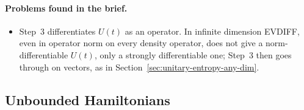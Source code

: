 \documentclass[11pt]{article}
\begin{document}
\paragraph{Problems found in the brief.}
\begin{itemize}
\item Step~3 differentiates $U(t)$ as an operator. In infinite dimension EVDIFF, even in
  operator norm on every density operator, does not give a norm-differentiable $U(t)$, only a
  strongly differentiable one; Step~3 then goes through on vectors, as in
  Section~\ref{sec:unitary-entropy-any-dim}.
\end{itemize}

\subsection{Unbounded Hamiltonians}\label{sec:unitary-entropy-unbounded}
\end{document}
